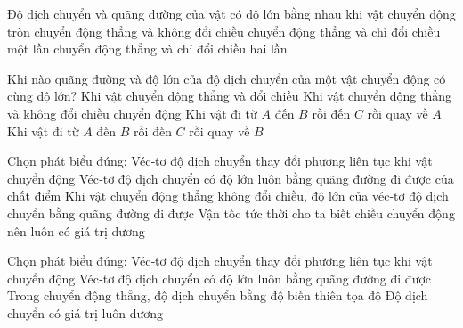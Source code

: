 \begin{ex}
Độ dịch chuyển và quãng đường của vật có độ lớn bằng nhau khi vật
\choice
{chuyển động tròn}
{\True chuyển động thẳng và không đổi chiều}
{chuyển động thẳng và chỉ đổi chiều một lần}
{chuyển động thẳng và chỉ đổi chiều hai lần}
\end{ex}

\begin{ex}
Khi nào quãng đường và độ lớn của độ dịch chuyển của một vật chuyển động có cùng độ lớn?
\choice
{Khi vật chuyển động thẳng và đổi chiều}
{\True Khi vật chuyển động thẳng và không đổi chiều chuyển động}
{Khi vật đi từ $A$ đến $B$ rồi đến $C$ rồi quay về $A$}
{Khi vật đi từ $A$ đến $B$ rồi đến $C$ rồi quay về $B$}
\end{ex}

\begin{ex}
Chọn phát biểu đúng:
\choice
{Véc‑tơ độ dịch chuyển thay đổi phương liên tục khi vật chuyển động}
{Véc‑tơ độ dịch chuyển có độ lớn luôn bằng quãng đường đi được của chất điểm}
{\True Khi vật chuyển động thẳng không đổi chiều, độ lớn của véc‑tơ độ dịch chuyển bằng quãng đường đi được}
{Vận tốc tức thời cho ta biết chiều chuyển động nên luôn có giá trị dương}
\end{ex}

\begin{ex}
Chọn phát biểu đúng:
\choice
{Véc‑tơ độ dịch chuyển thay đổi phương liên tục khi vật chuyển động}
{Véc‑tơ độ dịch chuyển có độ lớn luôn bằng quãng đường đi được}
{\True Trong chuyển động thẳng, độ dịch chuyển bằng độ biến thiên tọa độ}
{Độ dịch chuyển có giá trị luôn dương}
\end{ex}

